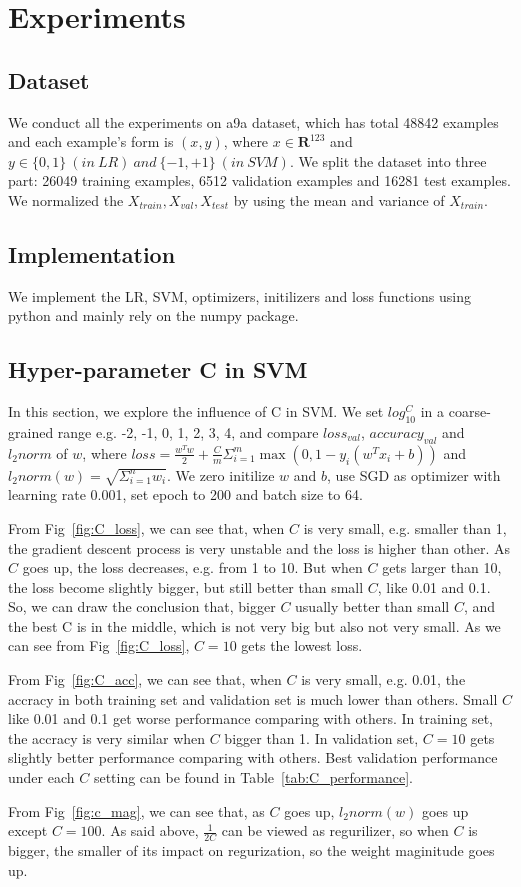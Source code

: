 \documentclass[journal, a4paper]{IEEEtran}
\begin{document}
\section{Experiments}
\subsection{Dataset}
We conduct all the experiments on a9a dataset, which has total 48842 examples and each example's form is $(x, y)$, where $x \in \mathbf{R}^{123}$ and $y \in \{0, 1\}~(in~LR)~and~\{-1, +1\}~(in~SVM)$. We split the dataset into three part: 26049 training examples, 6512 validation examples and 16281 test examples. We normalized the $X_{train}, X_{val}, X_{test} $ by using the mean and variance of $X_{train}$.

\subsection{Implementation}
We implement the LR, SVM, optimizers, initilizers and loss functions using python and mainly rely on the numpy package.

\subsection{Hyper-parameter C in SVM}
In this section, we explore the influence of C in SVM. We set $log_{10}^{C}$ in a coarse-grained range e.g. -2, -1, 0, 1, 2, 3, 4, and compare $loss_{val}$,  $accuracy_{val}$ and $l_2norm$ of $w$, where $loss =  \frac{w^Tw}{2} + \frac{C}{m}\Sigma_{i=1}^m \max(0, 1 - y_i(w^Tx_i + b))$ and $ l_2norm(w) = \sqrt{\Sigma_{i=1}^n w_i}$. We zero initilize $w$ and $b$, use SGD as optimizer with learning rate 0.001, set epoch to 200 and batch size to 64. \par
From Fig~\ref{fig:C_loss}, we can see that, when $C$ is very small, e.g. smaller than 1, the gradient descent process is very unstable and the loss is higher than other. As $C$ goes up, the loss decreases, e.g. from 1 to 10. But when $C$ gets larger than 10, the loss become slightly bigger, but still better than small $C$, like 0.01 and 0.1. So, we can draw the conclusion that, bigger $C$ usually better than small $C$, and the best C is in the middle, which is not very big but also not very small. As we can see from Fig~\ref{fig:C_loss}, $C = 10$ gets the lowest loss.   \par
From Fig~\ref{fig:C_acc}, we can see that, when $C$ is very small, e.g. 0.01, the accracy in both training set and validation set is much lower than others. Small $C$ like 0.01 and 0.1 get worse performance comparing with others. In training set, the accracy is very similar when $C$ bigger than 1. In validation set, $C = 10$ gets slightly better performance comparing with others. Best validation performance under each $C$ setting can be found in Table~\ref{tab:C_performance}. \par
From Fig~\ref{fig:c_mag}, we can see that, as $C$ goes up, $l_2norm(w)$ goes up except $C = 100$. As said above, $\frac{1}{2C}$ can be viewed as regurilizer, so when $C$ is bigger, the smaller of its impact on regurization, so the weight maginitude goes up. \par
\end{document}
